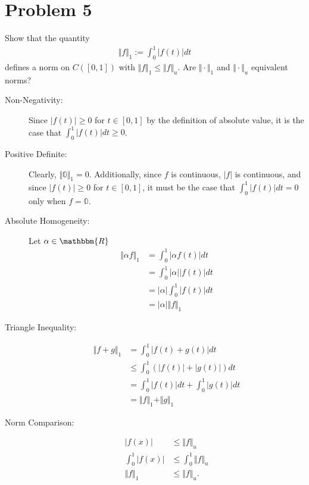 \documentclass[10pt]{extarticle}
\newcommand{\R}{\mathbbm{R}}
\begin{document}
  \section{Problem 5}%
  Show that the quantity
  \begin{align*}
    \Vert f \Vert_1 := \int_{0}^{1}|f(t)| dt
  \end{align*}
  defines a norm on $C([0,1])$ with $\Vert f\Vert_1 \leq \Vert f \Vert_u$. Are $\Vert \cdot \Vert_1$ and $\Vert \cdot \Vert_u$ equivalent norms?
  \begin{description}
    \item[Non-Negativity:] Since $|f(t)| \geq 0$ for $t\in [0,1]$ by the definition of absolute value, it is the case that $\int_{0}^{1}|f(t)|dt\geq 0$.
    \item[Positive Definite:] Clearly, $\Vert \mathbb{0}\Vert_1 = 0$. Additionally, since $f$ is continuous, $|f|$ is continuous, and since $|f(t)| \geq 0$ for $t\in [0,1]$, it must be the case that $\int_{0}^{1}|f(t)|dt = 0$ only when $f = \mathbb{0}$.
    \item[Absolute Homogeneity:] Let $\alpha\in\R$
      \begin{align*}
        \Vert \alpha f \Vert_1 &= \int_{0}^{1}|\alpha f(t)|dt\\
                               &= \int_{0}^{1}|\alpha||f(t)|dt\\
                               &= |\alpha|\int_{0}^{1}|f(t)|dt\\
                               &= |\alpha|\Vert f\Vert_1
      \end{align*}
    \item[Triangle Inequality:]
      \begin{align*}
        \Vert f + g \Vert_1 &= \int_{0}^{1}|f(t) + g(t)|dt\\
                            &\leq \int_{0}^{1}\left(|f(t)| + |g(t)|\right)dt\\
                            &= \int_{0}^{1}|f(t)|dt + \int_{0}^{1}|g(t)|dt\\
                            &= \Vert f \Vert_1 + \Vert g \Vert_1
      \end{align*}
    \item[Norm Comparison:]
      \begin{align*}
        |f(x)| &\leq \Vert f \Vert_u \tag*{Definition of Supremum}\\
        \int_{0}^{1}|f(x)| &\leq \int_{0}^{1}\Vert f \Vert_{u}\\
        \Vert f \Vert_{1} &\leq \Vert f \Vert_{u}.
      \end{align*}
  \end{description}
\end{document}
